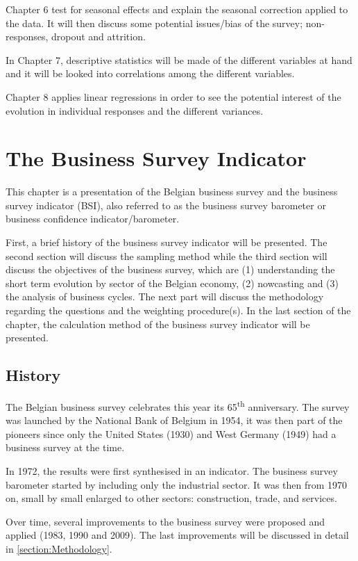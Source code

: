 \documentclass[12pt,a4paper,oneside]{book}
\begin{document}
Chapter 6 test for seasonal effects and explain the seasonal correction applied to the data. It will then discuss some potential issues/bias of the survey; non-responses, dropout and attrition.

In Chapter 7, descriptive statistics will be made of the different variables at hand and it will be looked into correlations among the different variables.

Chapter 8 applies linear regressions in order to see the potential interest of the evolution in individual responses and the different variances.



\chapter{The Business Survey Indicator}

This chapter is a presentation of the Belgian business survey and the business survey indicator (BSI), also referred to as the business survey barometer or business confidence indicator/barometer.

First, a brief history of the business survey indicator will be presented.
The second section will discuss the sampling method while the third section will discuss the objectives of the business survey, which are (1) understanding the short term evolution by sector of the Belgian economy, (2) nowcasting and (3) the analysis of business cycles.
The next part will discuss the methodology regarding the questions and the weighting procedure(s).
In the last section of the chapter, the calculation method of the business survey indicator will be presented.


\section{History}

The Belgian business survey celebrates this year its 65\textsuperscript{th} anniversary. The survey was launched by the National Bank of Belgium in 1954, it was then part of the pioneers since only the United States (1930) and West Germany (1949) had a business survey at the time.

In 1972, the results were first synthesised in an indicator.
The business survey barometer started by including only the industrial sector. It was then from 1970 on, small by small enlarged to other sectors: construction, trade, and services. 

Over time, several improvements to the business survey were proposed and applied (1983, 1990 and 2009). The last improvements will be discussed in detail in \autoref{section:Methodology}.
\end{document}
